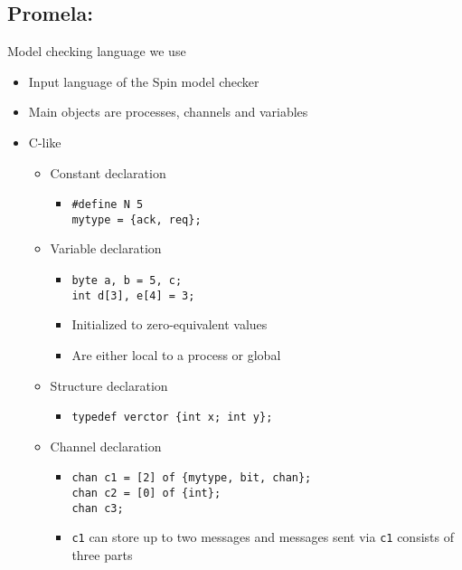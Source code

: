 \subsection{Promela:} Model checking language we use
\begin{itemize}
    \item Input language of the Spin model checker
    \item Main objects are processes, channels and variables
    \item C-like
        \begin{itemize}
            \item Constant declaration
                \begin{itemize}
                    \item
\begin{verbatim}
#define N 5
mytype = {ack, req};
\end{verbatim}
                \end{itemize}
            \item Variable declaration
                \begin{itemize}
                    \item
\begin{verbatim}
byte a, b = 5, c;
int d[3], e[4] = 3;
\end{verbatim}
                    \item Initialized to zero-equivalent values
                    \item Are either local to a process or global
                \end{itemize}
            \item Structure declaration
                \begin{itemize}
                    \item
\begin{verbatim}
typedef verctor {int x; int y};
\end{verbatim}
                \end{itemize}
            \item Channel declaration
                \begin{itemize}
                    \item
\begin{verbatim}
chan c1 = [2] of {mytype, bit, chan};
chan c2 = [0] of {int};
chan c3;
\end{verbatim}
                    \item \verb+c1+ can store up to two messages and messages sent via \verb+c1+ consists of three parts

\end{itemize}
\end{itemize}
\end{itemize}
